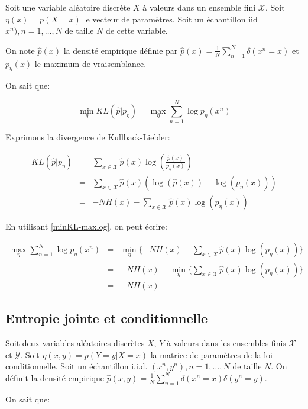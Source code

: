 \documentclass{article}
\begin{document}
Soit une variable aléatoire discrète $X$ à valeurs dans un ensemble fini
$\mathcal{X}$. Soit $\eta(x) = p(X =x)$ le vecteur de paramètres. Soit un
échantillon iid $x^n), n=1, \dots, N$ de taille $N$ de cette variable.

On note $\hat{p}(x)$ la densité empirique définie par $\hat{p}(x) =
\frac{1}{N} \sum_{n=1}^N \delta(x^n = x)$ et $p_{\eta}(x)$ le maximum de vraisemblance.

On sait que:

\begin{equation}
\label{minKL-maxlog}
\min_{\eta} KL(\hat{p}|p_{\eta}) = \max_{\eta} \sum_{n = 1}^N \log p_{\eta}(x^n)
\end{equation}

Exprimons la divergence de Kullback-Liebler:

\begin{align}
KL(\hat{p}|p_{\eta}) & = & \sum_{x \in \mathcal{X}} \hat{p}(x) \log(\frac{\hat{p}(x)}{p_{\eta}(x)}) \\
		     & = & \sum_{x \in \mathcal{X}} \hat{p}(x) (\log(\hat{p}(x)) - \log(p_{\eta}(x))) \\
		     & = & - NH(x) - \sum_{x \in \mathcal{X}} \hat{p}(x) \log(p_{\eta}(x))
\end{align}

En utilisant \ref{minKL-maxlog}, on peut écrire:

\begin{align}
\max_{\eta} \sum_{n = 1}^N \log p_{\eta}(x^n) & = & \min_{\eta} \{- NH(x) - \sum_{x \in \mathcal{X}} \hat{p}(x) \log(p_{\eta}(x))\} \\
					      & = & - NH(x) - \min_{\eta} \{\sum_{x \in \mathcal{X}} \hat{p}(x) \log(p_{\eta}(x))\} \\
					      & = & - NH(x)
\end{align}

\subsection{Entropie jointe et conditionnelle}

Soit deux variables aléatoires discrètes $X$, $Y$ à valeurs dans les ensembles
finis $\mathcal{X}$ et $\mathcal{Y}$. Soit $\eta(x, y) = p(Y = y | X = x)$ la
matrice de paramètres de la loi conditionnelle. Soit un échantillon i.i.d.
$(x^n, y^n), n=1, \dots, N$ de taille $N$. On définit la densité empirique
$\hat{p}(x, y) = \frac{1}{N} \sum_{n=1}^N \delta(x^n = x) \delta(y^n = y)$.

On sait que:
\end{document}
